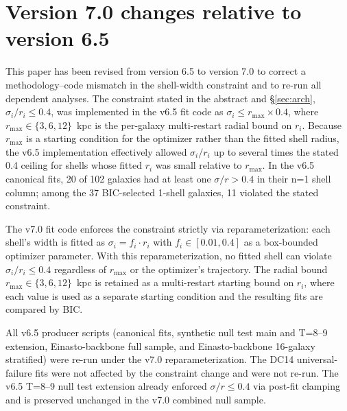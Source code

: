 \section{Version 7.0 changes relative to version 6.5}
\label{app:v7changelog}

This paper has been revised from version 6.5 to version 7.0 to correct a methodology--code mismatch in the shell-width constraint and to re-run all dependent analyses. The constraint stated in the abstract and \S\ref{sec:arch}, $\sigma_i / r_i \leq 0.4$, was implemented in the v6.5 fit code as $\sigma_i \leq r_{\max} \times 0.4$, where $r_{\max} \in \{3, 6, 12\}$~kpc is the per-galaxy multi-restart radial bound on $r_i$. Because $r_{\max}$ is a starting condition for the optimizer rather than the fitted shell radius, the v6.5 implementation effectively allowed $\sigma_i / r_i$ up to several times the stated 0.4 ceiling for shells whose fitted $r_i$ was small relative to $r_{\max}$. In the v6.5 canonical fits, 20 of 102 galaxies had at least one $\sigma/r > 0.4$ in their n=1 shell column; among the 37 BIC-selected 1-shell galaxies, 11 violated the stated constraint.

The v7.0 fit code enforces the constraint strictly via reparameterization: each shell's width is fitted as $\sigma_i = f_i \cdot r_i$ with $f_i \in [0.01, 0.4]$ as a box-bounded optimizer parameter. With this reparameterization, no fitted shell can violate $\sigma_i / r_i \leq 0.4$ regardless of $r_{\max}$ or the optimizer's trajectory. The radial bound $r_{\max} \in \{3, 6, 12\}$~kpc is retained as a multi-restart starting bound on $r_i$, where each value is used as a separate starting condition and the resulting fits are compared by BIC.

All v6.5 producer scripts (canonical fits, synthetic null test main and T=8--9 extension, Einasto-backbone full sample, and Einasto-backbone 16-galaxy stratified) were re-run under the v7.0 reparameterization. The DC14 universal-failure fits were not affected by the constraint change and were not re-run. The v6.5 T=8--9 null test extension already enforced $\sigma/r \leq 0.4$ via post-fit clamping and is preserved unchanged in the v7.0 combined null sample.

